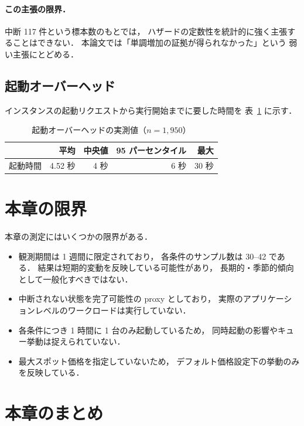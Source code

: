 \documentclass[11pt,a4paper]{ltjsreport}
\begin{document}
\paragraph{この主張の限界．}
中断 117 件という標本数のもとでは，
ハザードの定数性を統計的に強く主張することはできない．
本論文では「単調増加の証拠が得られなかった」という
弱い主張にとどめる．

\subsection{起動オーバーヘッド}

インスタンスの起動リクエストから実行開始までに要した時間を
表~\ref{tab:startup} に示す．

\begin{table}[htbp]
\centering
\caption{起動オーバーヘッドの実測値（$n = 1{,}950$）}
\label{tab:startup}
\small
\begin{tabular}{@{}lrrrr@{}}
\toprule
 & 平均 & 中央値 & 95 パーセンタイル & 最大 \\
\midrule
起動時間 & 4.52 秒 & 4 秒 & 6 秒 & 30 秒 \\
\bottomrule
\end{tabular}
\end{table}

\section{本章の限界}
\label{sec:limit_measure}

本章の測定にはいくつかの限界がある．

\begin{itemize}
  \item 観測期間は 1 週間に限定されており，
        各条件のサンプル数は 30--42 である．
        結果は短期的変動を反映している可能性があり，
        長期的・季節的傾向として一般化すべきではない．
  \item 中断されない状態を完了可能性の proxy としており，
        実際のアプリケーションレベルのワークロードは実行していない．
  \item 各条件につき 1 時間に 1 台のみ起動しているため，
        同時起動の影響やキュー挙動は捉えられていない．
  \item 最大スポット価格を指定していないため，
        デフォルト価格設定下の挙動のみを反映している．
\end{itemize}

\section{本章のまとめ}
\end{document}

